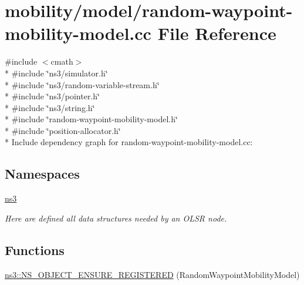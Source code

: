 \hypertarget{random-waypoint-mobility-model_8cc}{}\section{mobility/model/random-\/waypoint-\/mobility-\/model.cc File Reference}
\label{random-waypoint-mobility-model_8cc}
{\ttfamily \#include $<$cmath$>$}\\*
{\ttfamily \#include \char`\"{}ns3/simulator.\+h\char`\"{}}\\*
{\ttfamily \#include \char`\"{}ns3/random-\/variable-\/stream.\+h\char`\"{}}\\*
{\ttfamily \#include \char`\"{}ns3/pointer.\+h\char`\"{}}\\*
{\ttfamily \#include \char`\"{}ns3/string.\+h\char`\"{}}\\*
{\ttfamily \#include \char`\"{}random-\/waypoint-\/mobility-\/model.\+h\char`\"{}}\\*
{\ttfamily \#include \char`\"{}position-\/allocator.\+h\char`\"{}}\\*
Include dependency graph for random-\/waypoint-\/mobility-\/model.cc\+:
\subsection*{Namespaces}
\begin{DoxyCompactItemize}
\item 
 \hyperlink{namespacens3}{ns3}
\begin{DoxyCompactList}\small\item\em Here are defined all data structures needed by an O\+L\+SR node. \end{DoxyCompactList}\end{DoxyCompactItemize}
\subsection*{Functions}
\begin{DoxyCompactItemize}
\item 
\hyperlink{namespacens3_a88dca76fd1f3980218bdce1d9e0bbfaf}{ns3\+::\+N\+S\+\_\+\+O\+B\+J\+E\+C\+T\+\_\+\+E\+N\+S\+U\+R\+E\+\_\+\+R\+E\+G\+I\+S\+T\+E\+R\+ED} (Random\+Waypoint\+Mobility\+Model)
\end{DoxyCompactItemize}
